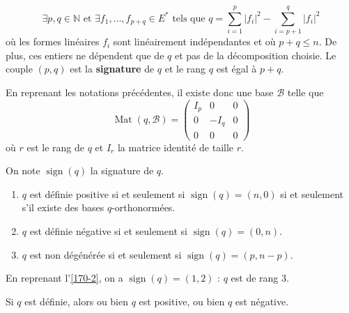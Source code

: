 
  \begin{theorem}
    \[ \exists p, q \in \mathbb{N} \text{ et } \exists f_1, \dots, f_{p+q} \in E^* \text{ tels que } q = \sum_{i=1}^p |f_i|^2 - \sum_{i=p+1}^q |f_i|^2 \]
    où les formes linéaires $f_i$ sont linéairement indépendantes et où $p + q \leq n$. De plus, ces entiers ne dépendent que de $q$ et pas de la décomposition choisie.
    \newpar
    Le couple $(p,q)$ est la \textbf{signature} de $q$ et le rang $q$ est égal à $p+q$.
  \end{theorem}

  \begin{remark}
    En reprenant les notations précédentes, il existe donc une base $\mathcal{B}$ telle que
    \[
    \operatorname{Mat}(q, \mathcal{B}) =
    \begin{pmatrix}
      I_p & 0 & 0 \\
      0 & -I_q & 0 \\
      0 & 0 & 0
    \end{pmatrix}
    \]
    où $r$ est le rang de $q$ et $I_r$ la matrice identité de taille $r$.
  \end{remark}


  \begin{corollary}
    On note $\operatorname{sign}(q)$ la signature de $q$.
    \begin{enumerate}[label=(\roman*)]
      \item $q$ est définie positive si et seulement si $\operatorname{sign}(q) = (n, 0)$ si et seulement s'il existe des bases $q$-orthonormées.
      \item $q$ est définie négative si et seulement si $\operatorname{sign}(q) = (0, n)$.
      \item $q$ est non dégénérée si et seulement si $\operatorname{sign}(q) = (p, n-p)$.
    \end{enumerate}
  \end{corollary}


  \begin{example}
    En reprenant l'\cref{170-2}, on a $\operatorname{sign}(q) = (1,2)$ : $q$ est de rang $3$.
  \end{example}

  \begin{proposition}
    Si $q$ est définie, alors ou bien $q$ est positive, ou bien $q$ est négative.
  \end{proposition}

